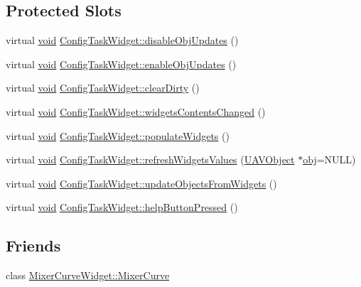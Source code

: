 \subsection*{Protected Slots}
\begin{DoxyCompactItemize}
\item 
virtual \hyperlink{group___u_a_v_objects_plugin_ga444cf2ff3f0ecbe028adce838d373f5c}{void} \hyperlink{group___u_a_v_object_widget_utils_ga32ef249bc6ebe47b9fe60812e09476da}{Config\-Task\-Widget\-::disable\-Obj\-Updates} ()
\item 
virtual \hyperlink{group___u_a_v_objects_plugin_ga444cf2ff3f0ecbe028adce838d373f5c}{void} \hyperlink{group___u_a_v_object_widget_utils_gafff7f205068866010a484ee95730b65b}{Config\-Task\-Widget\-::enable\-Obj\-Updates} ()
\item 
virtual \hyperlink{group___u_a_v_objects_plugin_ga444cf2ff3f0ecbe028adce838d373f5c}{void} \hyperlink{group___u_a_v_object_widget_utils_gae4dd854e5d93e1b268ffc473a7392493}{Config\-Task\-Widget\-::clear\-Dirty} ()
\item 
virtual \hyperlink{group___u_a_v_objects_plugin_ga444cf2ff3f0ecbe028adce838d373f5c}{void} \hyperlink{group___u_a_v_object_widget_utils_ga6860b8b666afa5a3254fd84ab1f9119e}{Config\-Task\-Widget\-::widgets\-Contents\-Changed} ()
\item 
virtual \hyperlink{group___u_a_v_objects_plugin_ga444cf2ff3f0ecbe028adce838d373f5c}{void} \hyperlink{group___u_a_v_object_widget_utils_gaa3d55f7941db619b9872b0ffdc78ebde}{Config\-Task\-Widget\-::populate\-Widgets} ()
\item 
virtual \hyperlink{group___u_a_v_objects_plugin_ga444cf2ff3f0ecbe028adce838d373f5c}{void} \hyperlink{group___u_a_v_object_widget_utils_ga7682451eb1e003d337c679fc8a36c6e1}{Config\-Task\-Widget\-::refresh\-Widgets\-Values} (\hyperlink{class_u_a_v_object}{U\-A\-V\-Object} $\ast$\hyperlink{glext_8h_a0c0d4701a6c89f4f7f0640715d27ab26}{obj}=N\-U\-L\-L)
\item 
virtual \hyperlink{group___u_a_v_objects_plugin_ga444cf2ff3f0ecbe028adce838d373f5c}{void} \hyperlink{group___u_a_v_object_widget_utils_ga4e59f88c43451ae4282077f9a9214cea}{Config\-Task\-Widget\-::update\-Objects\-From\-Widgets} ()
\item 
virtual \hyperlink{group___u_a_v_objects_plugin_ga444cf2ff3f0ecbe028adce838d373f5c}{void} \hyperlink{group___u_a_v_object_widget_utils_ga63ae96f50a8ed78f60d382dede4676d7}{Config\-Task\-Widget\-::help\-Button\-Pressed} ()
\end{DoxyCompactItemize}
\subsection*{Friends}
\begin{DoxyCompactItemize}
\item 
class \hyperlink{group___u_a_v_object_widget_utils_ga4dec7e6867bf4ed62c5309f7149f0dd0}{Mixer\-Curve\-Widget\-::\-Mixer\-Curve}
\end{DoxyCompactItemize}


